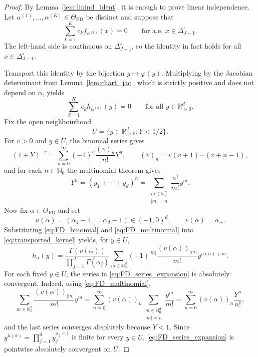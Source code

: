 \documentclass[10pt,a4paper]{amsart}
\begin{document}
\begin{proof}
By Lemma~\ref{lem:linind_ident}, it is enough to prove linear independence.
Let $\alpha^{(1)},\dots,\alpha^{(K)}\in\Theta_{\mathrm{FD}}$ be distinct
and suppose that 
\[
\sum_{k=1}^{K}c_{k}f_{\alpha^{(k)}}(x)=0\qquad\text{for a.e. }x\in\Delta_{J-1}^{\circ}.
\]
The left-hand side is continuous on $\Delta_{J-1}^{\circ}$, so the
identity in fact holds for all $x\in\Delta_{J-1}^{\circ}$.

Transport this identity by the bijection $y\mapsto\varphi(y)$. Multiplying
by the Jacobian determinant from Lemma~\ref{lem:chart_jac}, which
is strictly positive and does not depend on $\alpha$, yields 
\begin{equation}
\sum_{k=1}^{K}c_{k}h_{\alpha^{(k)}}(y)=0\qquad\text{for all }y\in\mathbb{R}_{>0}^{d}.\label{eq:FD_transport_identity}
\end{equation}
Fix the open neighbourhood 
\[
U=\{y\in\mathbb{R}_{>0}^{d}:Y<1/2\}.
\]
For $v>0$ and $y\in U$, the binomial series gives 
\begin{equation}
(1+Y)^{-v}=\sum_{n=0}^{\infty}(-1)^{n}\frac{(v)_{n}}{n!}Y^{n},\qquad(v)_{n}=v(v+1)\cdots(v+n-1),\label{eq:FD_binomial}
\end{equation}
and for each $n\in\mathbb{N}_{0}$ the multinomial theorem gives 
\begin{equation}
Y^{n}=(y_{1}+\cdots+y_{d})^{n}=\sum_{\substack{m\in\mathbb{N}_{0}^{d}\\
|m|=n
}
}\frac{n!}{m!}y^{m}.\label{eq:FD_multinomial}
\end{equation}
Now fix $\alpha\in\Theta_{\mathrm{FD}}$ and set 
\[
u(\alpha)=(\alpha_{1}-1,\dots,\alpha_{d}-1)\in(-1,0)^{d},\qquad v(\alpha)=\alpha_{+}.
\]
Substituting \eqref{eq:FD_binomial} and \eqref{eq:FD_multinomial}
into \eqref{eq:transported_kernel} yields, for $y\in U$, 
\begin{equation}
h_{\alpha}(y)=\frac{\Gamma(v(\alpha))}{\prod_{j=1}^{J}\Gamma(\alpha_{j})}\sum_{m\in\mathbb{N}_{0}^{d}}(-1)^{|m|}\frac{(v(\alpha))_{|m|}}{m!}y^{u(\alpha)+m}.\label{eq:FD_series_expansion}
\end{equation}
For each fixed $y\in U$, the series in \eqref{eq:FD_series_expansion}
is absolutely convergent. Indeed, using \eqref{eq:FD_multinomial},
\[
\sum_{m\in\mathbb{N}_{0}^{d}}\frac{(v(\alpha))_{|m|}}{m!}y^{m}=\sum_{n=0}^{\infty}(v(\alpha))_{n}\sum_{\substack{m\in\mathbb{N}_{0}^{d}\\
|m|=n
}
}\frac{y^{m}}{m!}=\sum_{n=0}^{\infty}(v(\alpha))_{n}\frac{Y^{n}}{n!},
\]
and the last series converges absolutely because $Y<1$. Since $y^{u(\alpha)}=\prod_{j=1}^{d}y_{j}^{\alpha_{j}-1}$
is finite for every $y\in U$, \eqref{eq:FD_series_expansion} is
pointwise absolutely convergent on $U$.


\end{proof}
\end{document}
